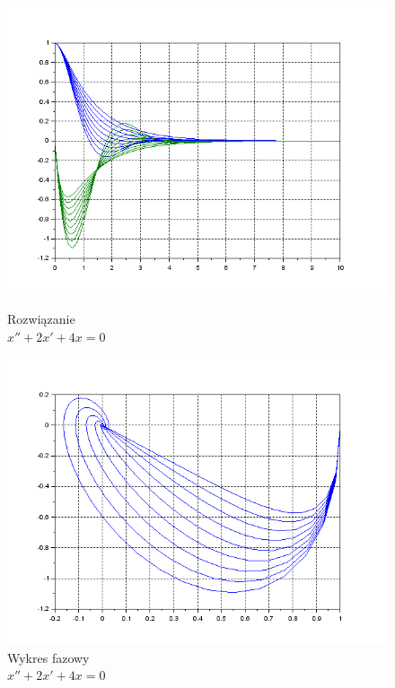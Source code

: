 \documentclass[12pt]{article}
\begin{document}
\begin{figure}[H]
  \centering
  \hspace{-1.6cm}
  \begin{minipage}[b]{0.49\textwidth}
    \includegraphics[scale=0.47]{./img/5-rowne-xy}
    \caption{Rozwiązanie \\ \centering $x''+2x'+4x=0$}
    \label{5-rowne-xy}
  \end{minipage}
  \hfill
  \begin{minipage}[b]{0.49\textwidth}
    \includegraphics[scale=0.47]{./img/5-rowne-phase}
    \caption{Wykres fazowy \\
    \centering $x''+2x'+4x=0$}
    \label{5-rowne-phase}
  \end{minipage}
\end{figure}
\end{document}
